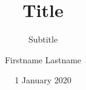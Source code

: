 \documentclass[parskip=half]{scrbook}
\title{Title}
\subtitle{Subtitle}
\author{Firstname Lastname}
\date{1 January 2020}
\providecommand{\listoflistings}{\lstlistoflistings}
\begin{document}
\frontmatter
\maketitle

\tableofcontents
\listoffigures
\listoftables
\listoflistings


\mainmatter



\backmatter
\appendix

\printglossaries

\end{document}
